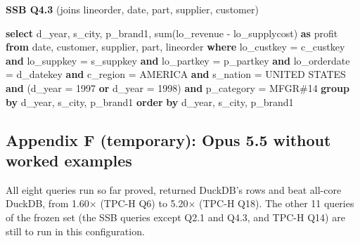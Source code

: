 \documentclass[
  10pt,
]{article}
\newenvironment{Shaded}{}{}
\newcommand{\DataTypeTok}[1]{\textcolor[rgb]{0.56,0.13,0.00}{#1}}
\newcommand{\DecValTok}[1]{\textcolor[rgb]{0.25,0.63,0.44}{#1}}
\newcommand{\FunctionTok}[1]{\textcolor[rgb]{0.02,0.16,0.49}{#1}}
\newcommand{\KeywordTok}[1]{\textcolor[rgb]{0.00,0.44,0.13}{\textbf{#1}}}
\newcommand{\NormalTok}[1]{#1}
\newcommand{\OperatorTok}[1]{\textcolor[rgb]{0.40,0.40,0.40}{#1}}
\newcommand{\StringTok}[1]{\textcolor[rgb]{0.25,0.44,0.63}{#1}}
\begin{document}
\textbf{SSB Q4.3} (joins lineorder, date, part, supplier, customer)

\begin{Shaded}
\begin{Highlighting}[]
\KeywordTok{select}\NormalTok{ d\_year, s\_city, p\_brand1, }\FunctionTok{sum}\NormalTok{(lo\_revenue }\OperatorTok{{-}}\NormalTok{ lo\_supplycost) }\KeywordTok{as}\NormalTok{ profit}
\KeywordTok{from} \DataTypeTok{date}\NormalTok{, customer, supplier, part, lineorder}
\KeywordTok{where}\NormalTok{ lo\_custkey }\OperatorTok{=}\NormalTok{ c\_custkey }\KeywordTok{and}\NormalTok{ lo\_suppkey }\OperatorTok{=}\NormalTok{ s\_suppkey }\KeywordTok{and}\NormalTok{ lo\_partkey }\OperatorTok{=}\NormalTok{ p\_partkey }\KeywordTok{and}\NormalTok{ lo\_orderdate }\OperatorTok{=}\NormalTok{ d\_datekey }\KeywordTok{and}\NormalTok{ c\_region }\OperatorTok{=} \StringTok{\textquotesingle{}AMERICA\textquotesingle{}} \KeywordTok{and}\NormalTok{ s\_nation }\OperatorTok{=} \StringTok{\textquotesingle{}UNITED STATES\textquotesingle{}} \KeywordTok{and}\NormalTok{ (d\_year }\OperatorTok{=} \DecValTok{1997} \KeywordTok{or}\NormalTok{ d\_year }\OperatorTok{=} \DecValTok{1998}\NormalTok{) }\KeywordTok{and}\NormalTok{ p\_category }\OperatorTok{=} \StringTok{\textquotesingle{}MFGR\#14\textquotesingle{}}
\KeywordTok{group} \KeywordTok{by}\NormalTok{ d\_year, s\_city, p\_brand1}
\KeywordTok{order} \KeywordTok{by}\NormalTok{ d\_year, s\_city, p\_brand1}
\end{Highlighting}
\end{Shaded}

\subsection{Appendix F (temporary): Opus 5.5 without worked
examples}\label{appendix-f-temporary-opus-5.5-without-worked-examples}

All eight queries run so far proved, returned DuckDB's rows and beat
all-core DuckDB, from 1.60\ensuremath{\times} (TPC-H Q6) to 5.20\ensuremath{\times} (TPC-H Q18). The other
11 queries of the frozen set (the SSB queries except Q2.1 and Q4.3, and
TPC-H Q14) are still to run in this configuration.
\end{document}
